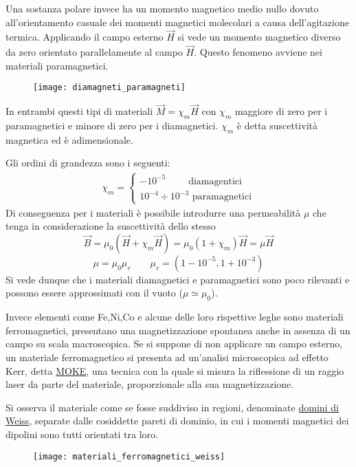 Una sostanza polare invece ha un momento magnetico medio nullo dovuto all'orientamento 
casuale dei momenti magnetici molecolari a causa dell'agitazione termica. 
Applicando il campo esterno $\vec{H}$ si vede un momento magnetico diverso da zero
orientato parallelamente al campo $\vec{H}$. Questo fenomeno avviene nei materiali 
paramagnetici.

\begin{figure}[H]
\centering
\texttt{[image: diamagneti\_paramagneti]}
\end{figure}

In entrambi questi tipi di materiali $\vec{M} = \chi_m \vec{H}$ con $\chi_m$ maggiore di 
zero per i paramagnetici e minore di zero per i diamagnetici.
$\chi_m$ è detta suscettività magnetica ed è adimensionale.

Gli ordini di grandezza sono i seguenti:
\begin{align*}
\chi_m = \begin{cases}
-10^{-5} \qquad \text{ diamagentici}\\
10^{-4} \div 10^{-3} \text{ paramagnetici}
\end{cases}
\end{align*}
Di conseguenza per i materiali è possibile introdurre una permeabilità $\mu$ che tenga
in considerazione la suscettività dello stesso
$$
\vec{B} = \mu_0 (\vec{H} + \chi_m\vec{H}) = \mu_0 (1+\chi_m)\vec{H} = \mu\vec{H}
$$
$$
\mu = \mu_0\mu_r \qquad \mu_r = (1-10^{-5},1 + 10^{-3})
$$
Si vede dunque che i materiali diamagnetici e paramagnetici sono poco rilevanti e possono
essere approssimati con il vuoto ($\mu\simeq\mu_0$).

Invece elementi come Fe,Ni,Co e alcune delle loro rispettive leghe sono materiali
ferromagnetici, presentano una magnetizzazione spontanea anche in assenza di un campo su 
scala macroscopica.
Se si suppone di non applicare un campo esterno, un materiale ferromagnetico si presenta
ad un'analisi microscopica ad effetto Kerr, detta \href{https://en.wikipedia.org/wiki/Magneto-optic_Kerr_effect}{MOKE}, una tecnica con la quale si misura la riflessione
di un raggio laser da parte del materiale, proporzionale alla sua magnetizzazione.

Si osserva il materiale come se fosse suddiviso in regioni, denominate \href{https://it.wikipedia.org/wiki/Dominio_di_Weiss}{domini di Weiss}, separate dalle cosiddette
pareti di dominio, in cui i momenti magnetici dei dipolini sono tutti orientati tra loro.

\begin{figure}
\centering
\texttt{[image: materiali\_ferromagnetici\_weiss]}
\end{figure}

